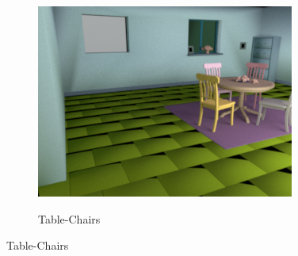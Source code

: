 \documentclass{jov}
\begin{document}
\begin{figure}[t]
\begin{subfigure}[b]{0.22 \textwidth}
        \caption{Table-Chairs}    
        \includegraphics[width=\textwidth]{../FiguresDraft4/Figure3/Figure3_c.png}
        \label{fig:baseSceneTableChairs}
    \end{subfigure}
    

\end{figure}
\end{document}
